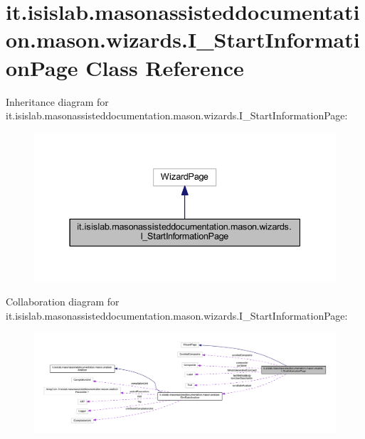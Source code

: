 \hypertarget{classit_1_1isislab_1_1masonassisteddocumentation_1_1mason_1_1wizards_1_1_i___start_information_page}{\section{it.\-isislab.\-masonassisteddocumentation.\-mason.\-wizards.\-I\-\_\-\-Start\-Information\-Page Class Reference}
\label{classit_1_1isislab_1_1masonassisteddocumentation_1_1mason_1_1wizards_1_1_i___start_information_page}
}


Inheritance diagram for it.\-isislab.\-masonassisteddocumentation.\-mason.\-wizards.\-I\-\_\-\-Start\-Information\-Page\-:
\nopagebreak
\begin{figure}[H]
\begin{center}
\leavevmode
\includegraphics[width=337pt]{classit_1_1isislab_1_1masonassisteddocumentation_1_1mason_1_1wizards_1_1_i___start_information_page__inherit__graph}
\end{center}
\end{figure}


Collaboration diagram for it.\-isislab.\-masonassisteddocumentation.\-mason.\-wizards.\-I\-\_\-\-Start\-Information\-Page\-:
\nopagebreak
\begin{figure}[H]
\begin{center}
\leavevmode
\includegraphics[width=350pt]{classit_1_1isislab_1_1masonassisteddocumentation_1_1mason_1_1wizards_1_1_i___start_information_page__coll__graph}
\end{center}
\end{figure}

